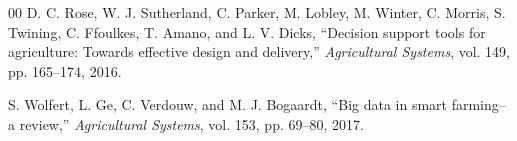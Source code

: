 \documentclass[journal]{IEEEtran}
\begin{document}
\begin{thebibliography}{00}
 D. C. Rose, W. J. Sutherland, C. Parker, M. Lobley, M. Winter, C. Morris, S. Twining, C. Ffoulkes, T. Amano, and L. V. Dicks, ``Decision support tools for agriculture: Towards effective design and delivery,'' \textit{Agricultural Systems}, vol. 149, pp. 165--174, 2016.

 S. Wolfert, L. Ge, C. Verdouw, and M. J. Bogaardt, ``Big data in smart farming--a review,'' \textit{Agricultural Systems}, vol. 153, pp. 69--80, 2017.

\end{thebibliography}

\vspace{12pt}
\end{document}

